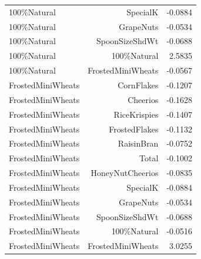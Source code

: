 \begin{longtable}{@{}lrr@{}}
100\%Natural & SpecialK & -0.0884 \\
100\%Natural & GrapeNuts & -0.0534 \\
100\%Natural & SpoonSizeShdWt & -0.0688 \\
100\%Natural & 100\%Natural & 2.5835 \\
100\%Natural & FrostedMiniWheats & -0.0567 \\
FrostedMiniWheats & CornFlakes & -0.1207 \\
FrostedMiniWheats & Cheerios & -0.1628 \\
FrostedMiniWheats & RiceKrispies & -0.1407 \\
FrostedMiniWheats & FrostedFlakes & -0.1132 \\
FrostedMiniWheats & RaisinBran & -0.0752 \\
FrostedMiniWheats & Total & -0.1002 \\
FrostedMiniWheats & HoneyNutCheerios & -0.0835 \\
FrostedMiniWheats & SpecialK & -0.0884 \\
FrostedMiniWheats & GrapeNuts & -0.0534 \\
FrostedMiniWheats & SpoonSizeShdWt & -0.0688 \\
FrostedMiniWheats & 100\%Natural & -0.0516 \\
FrostedMiniWheats & FrostedMiniWheats & 3.0255 \\
\bottomrule
\end{longtable}
\endgroup
